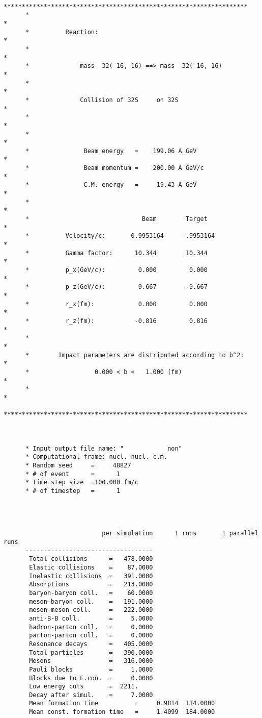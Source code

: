 \documentclass[]{article}
\begin{document}
\begin{verbatim}
      *******************************************************************
      *                                                                 *
      *          Reaction:                                              *
      *                                                                 *
      *              mass  32( 16, 16) ==> mass  32( 16, 16)            *
      *                                                                 *
      *              Collision of 32S     on 32S                        *
      *                                                                 *
      *                                                                 *
      *               Beam energy   =    199.06 A GeV                   *
      *               Beam momentum =    200.00 A GeV/c                 *
      *               C.M. energy   =     19.43 A GeV                   *
      *                                                                 *
      *                               Beam        Target                *
      *          Velocity/c:       0.9953164     -.9953164              *
      *          Gamma factor:      10.344        10.344                *
      *          p_x(GeV/c):         0.000         0.000                *
      *          p_z(GeV/c):         9.667        -9.667                *
      *          r_x(fm):            0.000         0.000                *
      *          r_z(fm):           -0.816         0.816                *
      *                                                                 *
      *        Impact parameters are distributed according to b^2:      *
      *                  0.000 < b <   1.000 (fm)                       *
      *                                                                 *
      *******************************************************************



      * Input output file name: "            non"
      * Computational frame: nucl.-nucl. c.m.
      * Random seed     =     48827
      * # of event      =      1
      * Time step size  =100.000 fm/c
      * # of timestep   =      1




                           per simulation      1 runs       1 parallel runs
      -----------------------------------
       Total collisions      =   478.0000
       Elastic collisions    =    87.0000
       Inelastic collisions  =   391.0000
       Absorptions           =   213.0000
       baryon-baryon coll.   =    60.0000
       meson-baryon coll.    =   191.0000
       meson-meson coll.     =   222.0000
       anti-B-B coll.        =     5.0000
       hadron-parton coll.   =     0.0000
       parton-parton coll.   =     0.0000
       Resonance decays      =   405.0000
       Total particles       =   390.0000
       Mesons                =   316.0000
       Pauli blocks          =     1.0000
       Blocks due to E.con.  =     0.0000
       Low energy cuts       =  2211.    
       Decay after simul.    =     7.0000
       Mean formation time          =     0.9814  114.0000
       Mean const. formation time   =     1.4099  184.0000



\end{verbatim}
\end{document}
